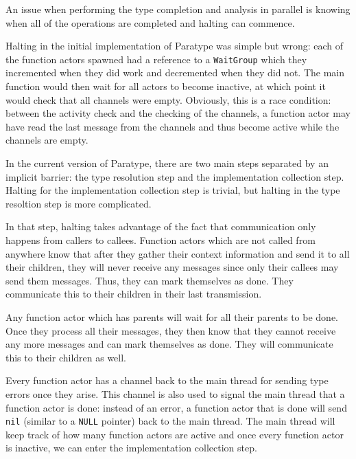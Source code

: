 \documentclass{acm_proc_article-sp}
\begin{document}
		An issue when performing the type completion and analysis in parallel
		is knowing when all of the operations are completed and halting can
		commence. 
		
		Halting in the initial implementation of Paratype was simple but wrong:
		each of the function actors spawned had a reference to a
		\texttt{WaitGroup} which they incremented when they did work and
		decremented when they did not. The main function would then wait for
		all actors to become inactive, at which point it would check that all
		channels were empty.  Obviously, this is a race condition: between the
		activity check and the checking of the channels, a function actor may
		have read the last message from the channels and thus become active
		while the channels are empty.

		In the current version of Paratype, there are two main steps separated
		by an implicit barrier: the type resolution step and the implementation
		collection step. Halting for the implementation collection step is
		trivial, but halting in the type resoltion step is more complicated. 
		
		In that step, halting takes advantage of the fact
		that communication only happens from callers to callees. Function
		actors which are not called from anywhere know that after they gather
		their context information and send it to all their children, they will
		never receive any messages since only their callees may send them
		messages. Thus, they can mark themselves as done. They communicate this
		to their children in their last transmission.

		Any function actor which has parents will wait for all their parents to
		be done. Once they process all their messages, they then know that they
		cannot receive any more messages and can mark themselves as done. They
		will communicate this to their children as well.

		Every function actor has a channel back to the main thread for sending
		type errors once they arise. This channel is also used to signal the
		main thread that a function actor is done: instead of an error, a
		function actor that is done will send \lstinline!nil! (similar to a
		\lstinline!NULL! pointer) back to the main thread. The main thread will
		keep track of how many function actors are active and once every
		function actor is inactive, we can enter the implementation collection
		step.

\end{document}

